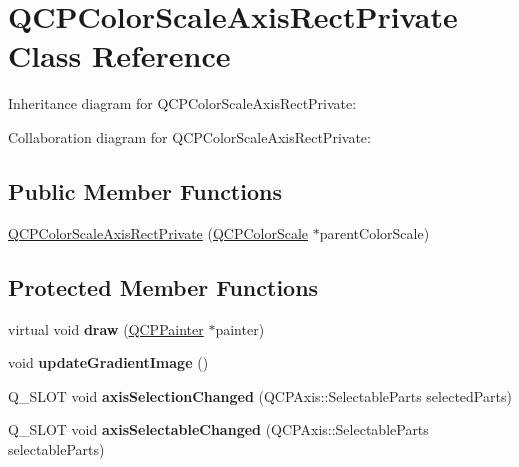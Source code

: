\hypertarget{class_q_c_p_color_scale_axis_rect_private}{}\section{Q\+C\+P\+Color\+Scale\+Axis\+Rect\+Private Class Reference}
\label{class_q_c_p_color_scale_axis_rect_private}


Inheritance diagram for Q\+C\+P\+Color\+Scale\+Axis\+Rect\+Private\+:


Collaboration diagram for Q\+C\+P\+Color\+Scale\+Axis\+Rect\+Private\+:
\subsection*{Public Member Functions}
\begin{DoxyCompactItemize}
\item 
\hyperlink{class_q_c_p_color_scale_axis_rect_private_ad3b242f75dd2b33581364a4e668a80db}{Q\+C\+P\+Color\+Scale\+Axis\+Rect\+Private} (\hyperlink{class_q_c_p_color_scale}{Q\+C\+P\+Color\+Scale} $\ast$parent\+Color\+Scale)
\end{DoxyCompactItemize}
\subsection*{Protected Member Functions}
\begin{DoxyCompactItemize}
\item 
virtual void {\bfseries draw} (\hyperlink{class_q_c_p_painter}{Q\+C\+P\+Painter} $\ast$painter)\hypertarget{class_q_c_p_color_scale_axis_rect_private_adb67bfe9057a9dd9a85f548c274e6d98}{}\label{class_q_c_p_color_scale_axis_rect_private_adb67bfe9057a9dd9a85f548c274e6d98}

\item 
void {\bfseries update\+Gradient\+Image} ()\hypertarget{class_q_c_p_color_scale_axis_rect_private_a73754cab312aeaddea1bfcc67cc079ac}{}\label{class_q_c_p_color_scale_axis_rect_private_a73754cab312aeaddea1bfcc67cc079ac}

\item 
Q\+\_\+\+S\+L\+OT void {\bfseries axis\+Selection\+Changed} (Q\+C\+P\+Axis\+::\+Selectable\+Parts selected\+Parts)\hypertarget{class_q_c_p_color_scale_axis_rect_private_a6112ad4291ac1695d37659cb049d598d}{}\label{class_q_c_p_color_scale_axis_rect_private_a6112ad4291ac1695d37659cb049d598d}

\item 
Q\+\_\+\+S\+L\+OT void {\bfseries axis\+Selectable\+Changed} (Q\+C\+P\+Axis\+::\+Selectable\+Parts selectable\+Parts)\hypertarget{class_q_c_p_color_scale_axis_rect_private_a66d2baed86966bb03a6d7c32dc7d59f7}{}\label{class_q_c_p_color_scale_axis_rect_private_a66d2baed86966bb03a6d7c32dc7d59f7}

\end{DoxyCompactItemize}
